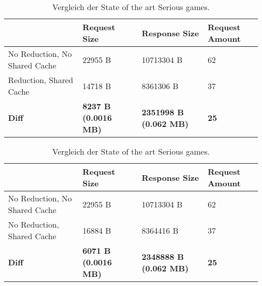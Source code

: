 \begin{table}[]
    \begin{tabular}{|l|l|l|l|}
    \hline
                                    & Request Size & Response Size & Request Amount  \\
    \hline
     No Reduction, No Shared Cache     &  22955 B        &  10713304 B   & 62 \\
     \hline
     Reduction, Shared Cache        &  14718 B        &  8361306 B   & 37 \\
     \hline
    \textbf{Diff}                   & \textbf{8237 B (0.0016 MB)} & \textbf{2351998 B (0.062  MB)} & \textbf{25} \\
     \hline
    \end{tabular}
    \caption{Vergleich der State of the art Serious games.}
    \label{tab:serious-game-comparison}
\end{table}

\begin{table}[]
    \begin{tabular}{|l|l|l|l|}
    \hline
                                    & Request Size & Response Size & Request Amount  \\
    \hline
     No Reduction, No Shared Cache     &  22955 B        &  10713304 B   & 62 \\
     \hline
     No Reduction, Shared Cache        &  16884 B        &  8364416 B   & 37 \\
     \hline
    \textbf{Diff}                   & \textbf{6071 B (0.0016 MB)} & \textbf{2348888 B (0.062  MB)} & \textbf{25} \\
     \hline
    \end{tabular}
    \caption{Vergleich der State of the art Serious games.}
    \label{tab:serious-game-comparison}
\end{table}
